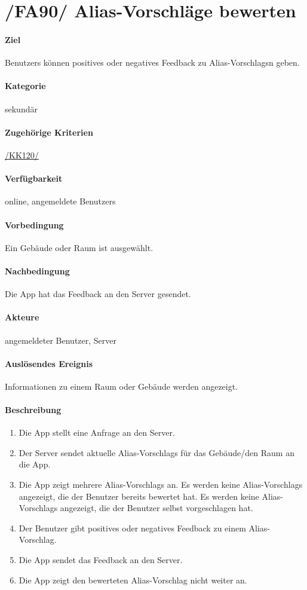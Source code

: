 \section[Alias-Vorschläge bewerten]{/FA90/ Alias-Vorschläge bewerten}
\label{/FA90/}
\paragraph{Ziel}
\Glspl{Benutzer} können positives oder negatives Feedback zu \Glspl{Alias-Vorschlag}n geben.
\paragraph{Kategorie}
sekundär
\paragraph{Zugehörige Kriterien}
\hyperref[/KK120/]{/KK120/}
\paragraph{Verfügbarkeit}
online, angemeldete \Glspl{Benutzer}
\paragraph{Vorbedingung}
Ein Gebäude oder Raum ist ausgewählt.
\paragraph{Nachbedingung}
Die App hat das Feedback an den \Gls{Server} gesendet.
\paragraph{Akteure}
angemeldeter \Gls{Benutzer}, \Gls{Server}
\paragraph{Auslösendes Ereignis}
Informationen zu einem Raum oder Gebäude werden angezeigt.
\paragraph{Beschreibung}
\begin{enumerate}
    \item Die App stellt eine Anfrage an den \Gls{Server}.
    \item Der \Gls{Server} sendet aktuelle \Glspl{Alias-Vorschlag} für das Gebäude/den Raum an die App.
    \item Die App zeigt mehrere \Glspl{Alias-Vorschlag} an. Es werden keine \Glspl{Alias-Vorschlag} angezeigt, die der \Gls{Benutzer} bereits bewertet hat. Es werden keine \Glspl{Alias-Vorschlag} angezeigt, die der \Gls{Benutzer} selbst vorgeschlagen hat.
    \item Der \Gls{Benutzer} gibt positives oder negatives Feedback zu einem \Gls{Alias-Vorschlag}.
    \item Die App sendet das Feedback an den \Gls{Server}.
    \item Die App zeigt den bewerteten \Gls{Alias-Vorschlag} nicht weiter an.
\end{enumerate}